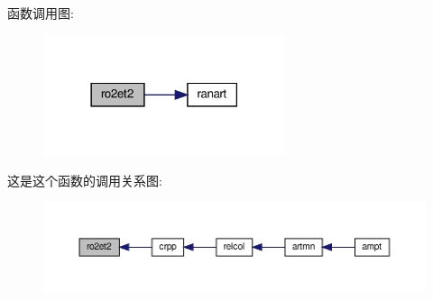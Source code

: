 函数调用图\+:
\nopagebreak
\begin{figure}[H]
\begin{center}
\leavevmode
\includegraphics[width=201pt]{ro2et2_8f90_a2ebcecaf60a9ff8cb2ca2db6893212fd_cgraph}
\end{center}
\end{figure}
这是这个函数的调用关系图\+:
\nopagebreak
\begin{figure}[H]
\begin{center}
\leavevmode
\includegraphics[width=350pt]{ro2et2_8f90_a2ebcecaf60a9ff8cb2ca2db6893212fd_icgraph}
\end{center}
\end{figure}
